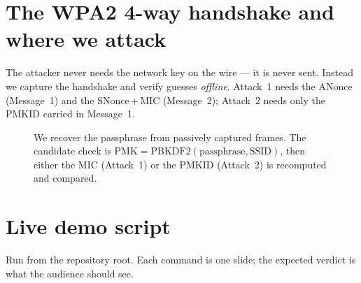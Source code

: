 \documentclass[11pt,a4paper]{article}
\begin{document}
\section{The WPA2 4-way handshake and where we attack}

The attacker never needs the network key on the wire --- it is never sent. Instead we
capture the handshake and verify guesses \emph{offline}. Attack~1 needs the ANonce
(Message~1) and the SNonce\,+\,MIC (Message~2); Attack~2 needs only the PMKID carried in
Message~1.

\begin{figure}[h]
\centering
{}
\caption{We recover the passphrase from passively captured frames. The candidate check is
$\text{PMK}=\text{PBKDF2}(\text{passphrase},\text{SSID})$, then either the MIC (Attack~1) or
the PMKID (Attack~2) is recomputed and compared.}
\end{figure}

\section{Live demo script}

Run from the repository root. Each command is one slide; the expected verdict is what the
audience should see.
\end{document}

